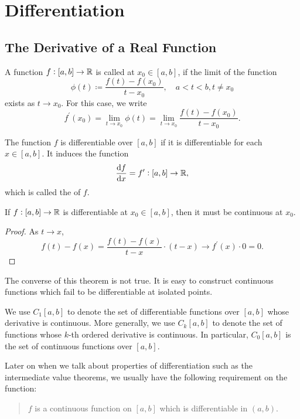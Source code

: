 \chapter{Differentiation}
\section{The Derivative of a Real Function}
\begin{definition}
A function $f:[a,b]\to\mathbb R$ is called  at $x_0\in[a,b]$, if the limit of the function
\[ \phi(t)\coloneqq\frac{f(t)-f(x_0)}{t-x_0}, \quad a<t<b, t\neq x_0 \]
exists as $t\to x_0$. For this case, we write
\begin{equation}\label{eqn:derivative}
f^\prime(x_0)=\lim_{t\to x_0}\phi(t)=\lim_{t\to x_0}\frac{f(t)-f(x_0)}{t-x_0}.
\end{equation}
\end{definition}

The function $f$ is differentiable over $[a,b]$ if it is differentiable for each $x\in[a,b]$. It induces the function
\[ \dv{f}{x}=f^\prime:[a,b]\to\mathbb R, \]
which is called the  of $f$.

\begin{theorem}\label{thrm:diff-cont}
If $f:[a,b]\to\mathbb R$ is differentiable at $x_0\in[a,b]$, then it must be continuous at $x_0$.
\end{theorem}

\begin{proof}
As $t\to x$,
\[ f(t)-f(x)=\frac{f(t)-f(x)}{t-x}\cdot(t-x)\to f^\prime(x)\cdot0=0. \]
\end{proof}

\begin{remark}
The converse of this theorem is not true. It is easy to construct continuous functions which fail to be differentiable at isolated points.
\end{remark}

\begin{notation}
We use $C_1[a,b]$ to denote the set of differentiable functions over $[a,b]$ whose derivative is continuous. More generally, we use $C_k[a,b]$ to denote the set of functions whose $k$-th ordered derivative is continuous. In particular, $C_0[a,b]$ is the set of continuous functions over $[a,b]$.
\end{notation}

Later on when we talk about properties of differentiation such as the intermediate value theorems, we usually have the following requirement on the function:
\begin{quote}
$f$ is a continuous function on $[a,b]$ which is differentiable in $(a,b)$.
\end{quote}

